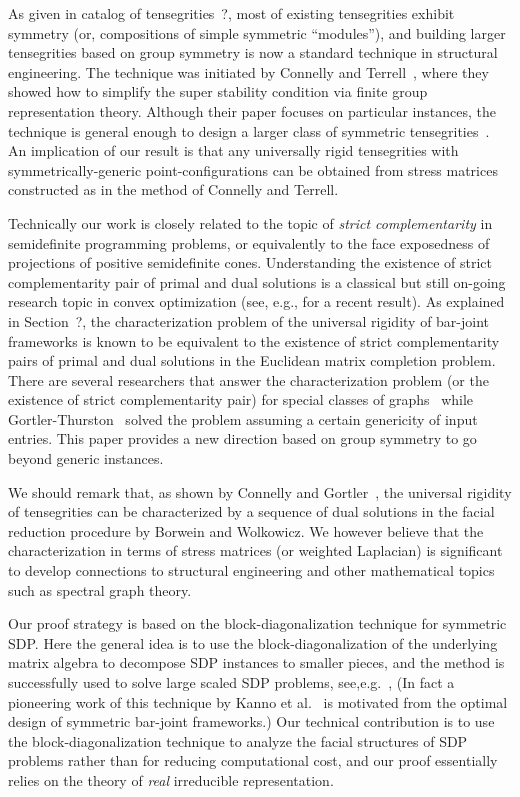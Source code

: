 \documentclass[11pt]{article}
\theoremstyle{definition}
\begin{document}
As given in catalog of tensegrities~?, most of existing tensegrities exhibit symmetry (or, compositions of simple symmetric ``modules''),
and building larger tensegrities based on group symmetry is now a standard technique in structural engineering. The technique was initiated by Connelly and Terrell~\cite{CT95}, where they showed how to simplify the super stability condition via finite group representation theory.
Although their paper focuses on particular instances, the technique is general enough to design a larger class of  symmetric tensegrities~\cite{CB98}.
An implication of our result is that any  universally rigid tensegrities with symmetrically-generic point-configurations can be obtained 
from stress matrices constructed as in the method of Connelly and Terrell.

Technically our work is closely related to the topic of {\em strict complementarity} in semidefinite programming problems, or equivalently to the face exposedness of projections of positive semidefinite cones. Understanding the existence of strict complementarity pair of primal and dual solutions is a classical  but still on-going research topic in convex optimization (see, e.g., \cite{dCT1} for a recent result). 
As explained in  Section~?,  the characterization problem of the universal rigidity  of bar-joint frameworks is known to be equivalent to the existence of strict complementarity pairs of primal and dual solutions in the Euclidean matrix completion problem. 
There are several researchers that answer the characterization problem (or  the existence of strict complementarity pair) for special classes of graphs~\cite{ATY13,DPW15,T17} while Gortler-Thurston~\cite{GT} solved the  problem assuming a certain genericity of input entries.  This paper provides  a new  direction based on group symmetry to go beyond generic instances.


We should remark that, as shown by Connelly and Gortler~\cite{connelly2015iterative},  the universal rigidity of tensegrities can be characterized by a sequence of dual solutions in the facial reduction procedure by Borwein and Wolkowicz. 
We however believe that the characterization in terms of stress matrices (or  weighted Laplacian) is significant to develop connections to structural engineering and other mathematical topics such as spectral graph theory.

Our proof strategy is based on the block-diagonalization technique for symmetric SDP. 
Here the general idea is to use the  block-diagonalization of the underlying matrix algebra to decompose SDP instances to smaller pieces,
and the method is successfully used to solve large scaled SDP problems, see,e.g.~\cite{bachoc2012invariant},
(In fact a pioneering work of this technique by Kanno et al.~ is motivated from the optimal design of symmetric bar-joint frameworks.)
Our technical contribution is to use the block-diagonalization technique to analyze the facial structures of SDP problems rather than for reducing computational cost, and our proof essentially relies on  the theory of {\em real} irreducible representation.
\end{document}
